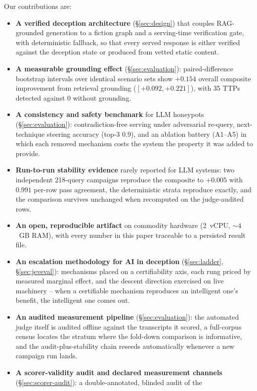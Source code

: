 \noindent Our contributions are:
\begin{itemize}
\item \textbf{A verified deception architecture} (\S\ref{sec:design}) that
couples RAG-grounded generation to a fiction graph and a serving-time
verification gate, with deterministic fallback, so that every served
response is either verified against the deception state or produced from
vetted static content.
\item \textbf{A measurable grounding effect} (\S\ref{sec:evaluation}):
paired-difference bootstrap intervals over identical scenario sets show
$+0.154$ overall composite improvement from retrieval grounding
($[+0.092, +0.221]$), with 35 TTPs detected against 0 without grounding.
\item \textbf{A consistency and safety benchmark} for LLM honeypots
(\S\ref{sec:evaluation}): contradiction-free serving under adversarial
re-query, next-technique steering accuracy (top-3 $0.9$), and an ablation
battery (A1--A5) in which each removed mechanism costs the system the
property it was added to provide.
\item \textbf{Run-to-run stability evidence} rarely reported for LLM
systems: two independent 218-query campaigns reproduce the composite to
$+0.005$ with $0.991$ per-row pass agreement, the deterministic
strata reproduce exactly, and the comparison survives unchanged when
recomputed on the judge-audited rows.
\item \textbf{An open, reproducible artifact} on commodity hardware
(2~vCPU, ${\sim}4$~GB RAM), with every number in this paper traceable to a
persisted result file.
\item \textbf{An escalation methodology for AI in deception}
(\S\ref{sec:ladder}, \S\ref{sec:jeveval}): mechanisms placed on a
certifiability axis, each rung priced by measured marginal effect, and
the descent direction exercised on live machinery -- when a certifiable
mechanism reproduces an intelligent one's benefit, the intelligent one
comes out.
\item \textbf{An audited measurement pipeline} (\S\ref{sec:evaluation}):
the automated judge itself is audited offline against the transcripts it
scored, a full-corpus census locates the stratum where the fold-down
comparison is informative, and the audit-plus-stability chain reseeds
automatically whenever a new campaign run lands.
\item \textbf{A scorer-validity audit and declared measurement channels}
(\S\ref{sec:scorer-audit}): a double-annotated, blinded audit of the

\end{itemize}
